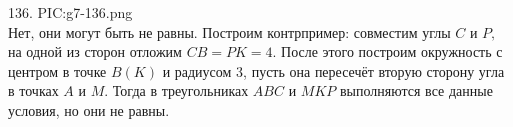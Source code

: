 136. {{PIC:g7-136.png}}\\
Нет, они могут быть не равны. Построим контрпример: совместим углы $C$ и $P,$ на одной из сторон отложим $CB=PK=4.$ После этого построим окружность с центром в точке $B(K)$ и радиусом 3, пусть она пересечёт вторую сторону угла в точках $A$ и $M.$ Тогда в треугольниках $ABC$ и $MKP$ выполняются все данные условия, но они не равны.\\

